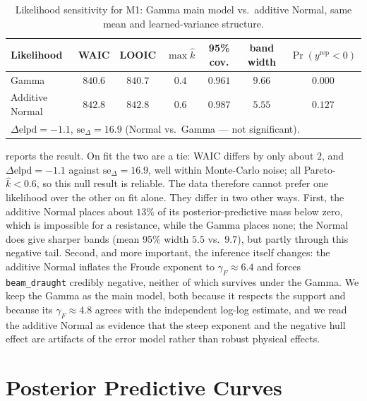 \documentclass[12pt,a4paper]{article}
\begin{document}
\begin{table}[h]
  \centering
  \caption{Likelihood sensitivity for M1: Gamma main model vs.\ additive Normal,
    same mean and learned-variance structure.}
  \label{tab:t3_lik_compare}
  \begin{tabular}{lcccccc}
    \toprule
    \textbf{Likelihood} & \textbf{WAIC} & \textbf{LOOIC} &
    $\max\hat k$ & \textbf{95\% cov.} & \textbf{band width} &
    $\Pr(y^{\mathrm{rep}}<0)$ \\
    \midrule
    Gamma           & $840.6$ & $840.7$ & $0.4$ & $0.961$ & $9.66$ & $0.000$ \\
    Additive Normal & $842.8$ & $842.8$ & $0.6$ & $0.987$ & $5.55$ & $0.127$ \\
    \midrule
    \multicolumn{7}{l}{\footnotesize $\Delta\mathrm{elpd}=-1.1$,\quad
      $\mathrm{se}_{\Delta}=16.9$ (Normal vs.\ Gamma --- not significant).}\\
    \bottomrule
  \end{tabular}
\end{table}

 reports the result. On fit the two are a tie: WAIC
differs by only about $2$, and $\Delta\mathrm{elpd}=-1.1$ against
$\mathrm{se}_{\Delta}=16.9$, well within Monte-Carlo noise; all Pareto-$\hat
k<0.6$, so this null result is reliable. The data therefore cannot prefer one
likelihood over the other on fit alone. They differ in two other ways. First, the
additive Normal places about $13\%$ of its posterior-predictive mass below zero,
which is impossible for a resistance, while the Gamma places none; the Normal does
give sharper bands (mean 95\% width $5.5$ vs.\ $9.7$), but partly through this
negative tail. Second, and more important, the inference itself changes: the
additive Normal inflates the Froude exponent to $\gamma_F\approx6.4$ and forces
\texttt{beam\_draught} credibly negative, neither of which survives under the
Gamma. We keep the Gamma as the main model, both because it respects the support
and because its $\gamma_F\approx4.8$ agrees with the independent log-log estimate,
and we read the additive Normal as evidence that the steep exponent and the
negative hull effect are artifacts of the error model rather than robust physical
effects.





\section{Posterior Predictive Curves}
\label{sec:posterior_predictive}
\end{document}
